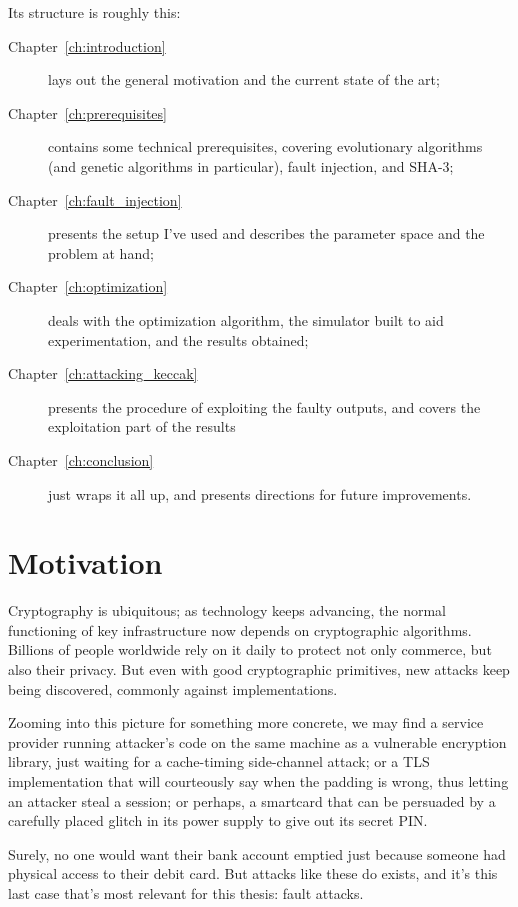 \documentclass[times, utf8, diplomski]{fer}
\begin{document}
Its structure is roughly this:
\begin{description}
    \item[Chapter~\ref{ch:introduction}] lays out the general motivation and
          the current state of the art;
    \item[Chapter~\ref{ch:prerequisites}] contains some technical prerequisites,
          covering evolutionary algorithms (and genetic algorithms in particular),
          fault injection, and SHA-3;
    \item[Chapter~\ref{ch:fault_injection}] presents the setup I've used and
          describes the parameter space and the problem at hand;
    \item[Chapter~\ref{ch:optimization}] deals with the optimization algorithm,
          the simulator built to aid experimentation, and the results obtained;
    \item[Chapter~\ref{ch:attacking_keccak}] presents the procedure of exploiting
          the faulty outputs, and covers the exploitation part of the results
    \item[Chapter~\ref{ch:conclusion}] just wraps it all up, and presents
          directions for future improvements.
\end{description}


\section{Motivation}
Cryptography is ubiquitous; as technology keeps advancing, the normal functioning
of key infrastructure now depends on cryptographic algorithms. Billions of people
worldwide rely on it daily to protect not only commerce, but also their privacy.
But even with good cryptographic primitives, new attacks keep being discovered,
commonly against implementations.

Zooming into this picture for something more concrete, we may find a service
provider running attacker's code on the same machine as a vulnerable encryption
library, just waiting for a cache-timing side-channel attack; or a TLS
implementation that will courteously say when the padding is wrong, thus letting
an attacker steal a session; or perhaps, a smartcard that can be persuaded by a
carefully placed glitch in its power supply to give out its secret PIN.

Surely, no one would want their bank account emptied just because someone had
physical access to their debit card. But attacks like these do exists, and it's
this last case that's most relevant for this thesis: fault attacks.
\end{document}
